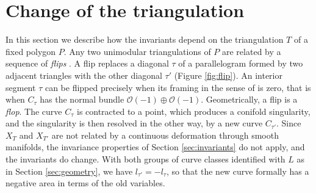 \documentclass[11pt]{article}
\newcommand{\CO}{\mathcal{O}}
\begin{document}
\section{Change of the triangulation}\label{sec:flops}

In this section we describe how the invariants depend on the triangulation $T$ of a fixed
polygon $P$. Any two unimodular triangulations of $P$ are related by a sequence of
\textit{flips} \cite{DLRS}. A flip replaces a diagonal $\tau$ of a parallelogram formed by two
adjacent triangles with the other diagonal $\tau'$ (Figure \ref{fig:flip}). An interior segment
$\tau$ can be flipped precisely when its framing in the sense of \cite{notes} is zero, that is
when $C_\tau$ has the normal bundle $\CO(-1)\oplus\CO(-1)$. Geometrically, a flip is a
\textit{flop}. The curve $C_\tau$ is contracted to a point, which produces a conifold
singularity, and the singularity is then resolved in the other way, by a new curve
$C_{\tau'}$. Since $X_T$ and $X_{T'}$ are not related by a continuous deformation through smooth
manifolds, the invariance properties of Section \ref{sec:invariants} do not apply, and the
invariants do change. With both groups of curve classes identified with $L$ as in
Section \ref{sec:geometry}, we have $l_{\tau'}=-l_\tau$, so that the new curve formally has a
negative area in terms of the old variables.
\end{document}
